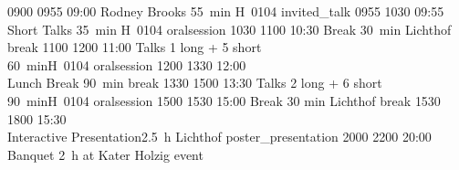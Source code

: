 \begin{timetable}
   {0900} {0955} {09:00 Rodney Brooks}                {55~min}                        {H~0104}                      {invited_talk}
   {0955} {1030} {09:55 Short Talks}                  {\vspace{1.5mm}35~min}          {\vspace{1.5mm}H~0104}        {oralsession}
   {1030} {1100} {10:30 Break}                        {\vspace{1.5mm}30~min}          {\vspace{1.5mm}Lichthof}      {break}
   {1100} {1200} {11:00 Talks}                        {\vspace{-0.5em}1 long + 5 short\\60~min}{H~0104}             {oralsession}
   {1200} {1330} {12:00\\[0.2em]Lunch Break}          {90~min}                        {}                            {break}
   {1330} {1500} {13:30 Talks}                        {\vspace{-0.5em}2 long + 6 short\\90~min}{H~0104}             {oralsession}
   {1500} {1530} {\vspace{-1.5mm}15:00 Break}         {\vspace{1.5mm}30 min}          {\vspace{1.5mm}Lichthof}      {break}
   {1530} {1800} {15:30\\\vspace{0.3em}Interactive Presentation}{2.5~h}               {Lichthof}                      {poster_presentation}
   {2000} {2200} {20:00\\\vspace{0.3em}Banquet}       {2~h}                              {\vspace{-0.7em}at Kater Holzig}     {event}



\end{timetable}
